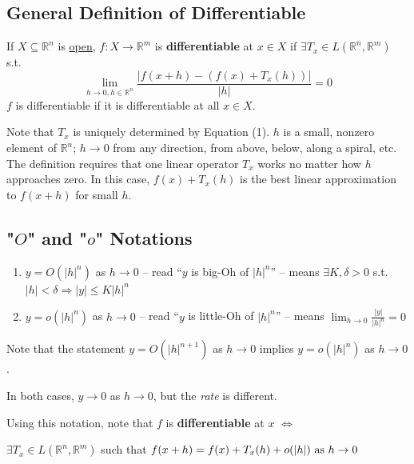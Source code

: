 \documentclass[11pt]{elegantbook}
\begin{document}
\subsection{General Definition of Differentiable}
\begin{definition}
    \normalfont
    If $X \subseteq \mathbb{R}^n$ is \underline{open}, $f : X \rightarrow \mathbb{R}^m$ is \textbf{differentiable} at $x \in X$ if $\exists T_x\in L(\mathbb{R}^n,\mathbb{R}^m)$ s.t. $$\lim_{h \rightarrow 0, h\in \mathbb{R}^n}\frac{|f(x+h)-(f(x)+T_x(h))|}{|h|}=0$$
    $f$ is differentiable if it is differentiable at all $x \in X$.
\end{definition}
Note that $T_x$ is uniquely determined by Equation (1). $h$ is a small, nonzero element of $\mathbb{R}^n$; $h \rightarrow 0$ from any direction, from above, below, along a spiral, etc. The definition requires that one linear operator $T_x$ works no matter how $h$ approaches zero. In this case, $f(x) + T_x(h)$ is the best linear approximation to $f(x + h)$ for small $h$.

\subsection{"$O$" and "$o$" Notations}
\begin{definition}["$O$" and "$o$"]
    \normalfont
    \begin{enumerate}
        \item $y = O(|h|^n)$ as $h \rightarrow 0$ -- read “$y$ is big-Oh of $|h|^n$” -- means $\exists K, \delta > 0$ s.t. $|h| < \delta \Rightarrow |y| \leq K|h|^n$
        \item $y = o(|h|^n)$ as $h \rightarrow 0$ -- read “$y$ is little-Oh of $|h|^n$” -- means $\lim_{h \rightarrow 0}\frac{|y|}{|h|^n}=0$
    \end{enumerate}
\end{definition}
\begin{note}
    Note that the statement $y = O(|h|^{n+1})$ as $h \rightarrow 0$ implies $y = o(|h|^n)$ as $h \rightarrow 0$.
\end{note}
In both cases, $y \rightarrow 0$ as $h \rightarrow 0$, but the \textit{rate} is different.

\begin{definition}
    \normalfont
    Using this notation, note that $f$ is \textbf{differentiable} at $x$ $\Leftrightarrow$
    \begin{center}
        $\exists T_x\in L(\mathbb{R}^n,\mathbb{R}^m)$ such that $f(x+h)=f(x)+T_x(h)+o(|h|)\textnormal{ as }h \rightarrow 0$
    \end{center}
\end{definition}
\end{document}
